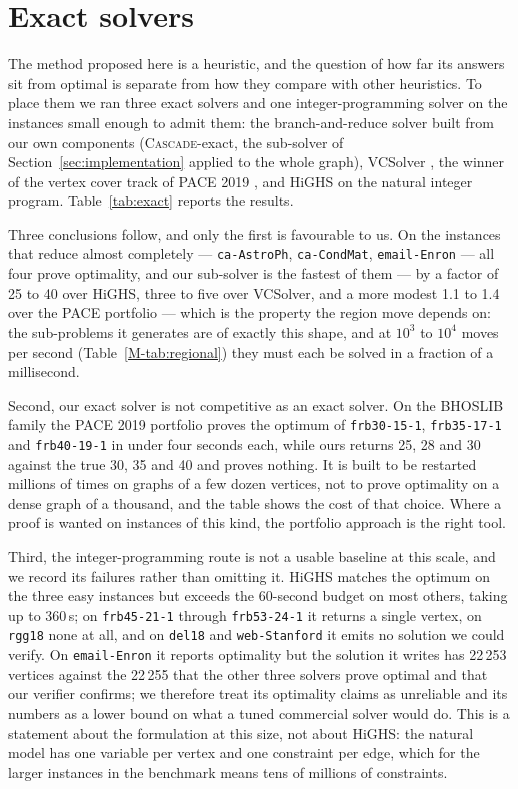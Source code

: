 \documentclass[preprint,authoryear,11pt]{elsarticle}
\theoremstyle{definition}
\begin{document}
\section{Exact solvers}
\label{sec:exact}

The method proposed here is a heuristic, and the question of how far its answers
sit from optimal is separate from how they compare with other heuristics. To
place them we ran three exact solvers and one integer-programming solver on the
instances small enough to admit them: the branch-and-reduce solver built from
our own components (\textsc{Cascade}-exact, the sub-solver of
Section~\ref{sec:implementation} applied to the whole graph), VCSolver
\citep{akiba2016}, the winner of the vertex cover track of PACE 2019
\citep{pace2019,hespe2020}, and HiGHS on the natural
integer program. Table~\ref{tab:exact} reports the results.

Three conclusions follow, and only the first is favourable to us. On the
instances that reduce almost completely --- \texttt{ca-AstroPh},
\texttt{ca-CondMat}, \texttt{email-Enron} --- all four prove optimality, and our
sub-solver is the fastest of them --- by a factor of 25 to 40 over HiGHS, three
to five over VCSolver, and a more modest 1.1 to 1.4 over the PACE portfolio ---
which is the property
the region move depends on: the sub-problems it generates are of exactly this
shape, and at $10^3$ to $10^4$ moves per second (Table~\ref{M-tab:regional}) they must each be solved in a fraction
of a millisecond.

Second, our exact solver is not competitive as an exact solver. On the BHOSLIB
family the PACE 2019 portfolio proves the optimum of \texttt{frb30-15-1},
\texttt{frb35-17-1} and \texttt{frb40-19-1} in under four seconds each, while
ours returns 25, 28 and 30 against the true 30, 35 and 40 and proves nothing.
It is built to be restarted millions of times on graphs of a few dozen vertices,
not to prove optimality on a dense graph of a thousand, and the table shows the
cost of that choice. Where a proof is wanted on instances of this kind, the
portfolio approach is the right tool.

Third, the integer-programming route is not a usable baseline at this scale, and
we record its failures rather than omitting it. HiGHS matches the optimum on the
three easy instances but exceeds the 60-second budget on most others, taking up
to 360\,s; on \texttt{frb45-21-1} through \texttt{frb53-24-1} it returns a single
vertex, on \texttt{rgg18} none at all, and on \texttt{del18} and
\texttt{web-Stanford} it emits no solution we could verify. On
\texttt{email-Enron} it reports optimality but the solution it writes has 22\,253
vertices against the 22\,255 that the other three solvers prove optimal and that
our verifier confirms; we therefore treat its optimality claims as unreliable
and its numbers as a lower bound on what a tuned commercial solver would do.
This is a statement about the formulation at this size, not about HiGHS: the
natural model has one variable per vertex and one constraint per edge, which for
the larger instances in the benchmark means tens of millions of constraints.
\end{document}
